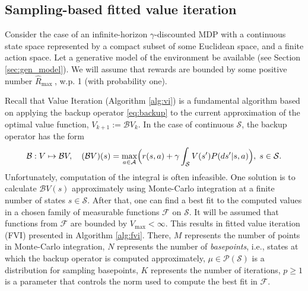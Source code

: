 \documentclass{article}
\numberwithin{equation}{section}
\newcommand{\cA}{\mathcal{A}}
\newcommand{\cF}{\mathcal{F}}
\newcommand{\cP}{\mathcal{P}}
\newcommand{\cS}{\mathcal{S}}
\begin{document}
\subsection{Sampling-based fitted value iteration}
Consider the case of an infinite-horizon \(\gamma\)-discounted MDP with a continuous state space represented by a compact subset of some Euclidean space, and a finite action space.
Let a generative model of the environment be available (see Section \ref{sec:gen_model}).
We will assume that rewards are bounded by some positive number \(\hat{R}_{\text {max }}\), w.p. 1 (with
probability one).

Recall that Value Iteration (Algorithm \ref{alg:vi}) is a fundamental algorithm based on applying the backup operator \eqref{eq:backup} to the current approximation of the optimal value function, $V_{k+1}:= \mathcal{B}V_k$. In the case of continuous $\cS$, the backup operator has the form
\begin{equation}\label{eq:backup_cont}
    \mathcal{B}: V \mapsto \mathcal{B}V,\quad (\mathcal{B}V)(s) = \max_{a\in\cA} \Bigl( r(s, a) + \gamma \int_{\cS} V(s') P(ds'|s,a) \Bigr),\; s\in\cS.
\end{equation}
Unfortunately, computation of the integral is often infeasible. One solution is to calculate $\mathcal{B}V(s)$ approximately using Monte-Carlo integration at a finite number of
states $s\in \cS$. After that, one can find a best fit to the computed values in a chosen family of measurable functions $\mathcal{F}$ on $\cS$. It will be assumed that functions from $\mathcal{F}$ are bounded by \(V_{\text{max}}< \infty \). This results in fitted value iteration (FVI) \citep{munos2008finite} presented in Algorithm \ref{alg:fvi}. There, $M$ represents the number of points in Monte-Carlo integration, $N$ represents the number of \emph{basepoints}, i.e., states at which the backup operator is computed approximately, $\mu \in \cP(\cS)$ is a distribution for sampling basepoints, $K$ represents the number of iterations, $p\geq 1$ is a parameter that controls the norm used to compute the best fit in $\cF$.
\end{document}
